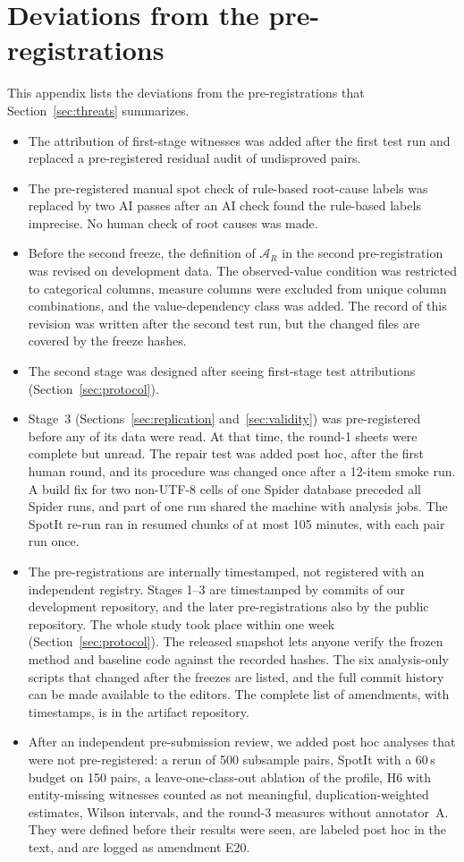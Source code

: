 \section{Deviations from the pre-registrations}\label{app:deviations}
This appendix lists the deviations from the pre-registrations that Section~\ref{sec:threats} summarizes.
\begin{itemize}
\item[(i)] The attribution of first-stage witnesses was added after the first test run and replaced a pre-registered residual audit of undisproved pairs.
\item[(ii)] The pre-registered manual spot check of rule-based root-cause labels was replaced by two AI passes after an AI check found the rule-based labels imprecise. No human check of root causes was made.
\item[(iii)] Before the second freeze, the definition of $\mathcal A_R$ in the second pre-registration was revised on development data. The observed-value condition was restricted to categorical columns, measure columns were excluded from unique column combinations, and the value-dependency class was added. The record of this revision was written after the second test run, but the changed files are covered by the freeze hashes.
\item[(iv)] The second stage was designed after seeing first-stage test attributions (Section~\ref{sec:protocol}).
\item[(v)] Stage~3 (Sections~\ref{sec:replication} and~\ref{sec:validity}) was pre-registered before any of its data were read. At that time, the round-1 sheets were complete but unread. The repair test was added post hoc, after the first human round, and its procedure was changed once after a 12-item smoke run. A build fix for two non-UTF-8 cells of one Spider database preceded all Spider runs, and part of one run shared the machine with analysis jobs. The SpotIt re-run ran in resumed chunks of at most 105 minutes, with each pair run once.
\item[(vi)] The pre-registrations are internally timestamped, not registered with an independent registry. Stages 1--3 are timestamped by commits of our development repository, and the later pre-registrations also by the public repository. The whole study took place within one week (Section~\ref{sec:protocol}). The released snapshot lets anyone verify the frozen method and baseline code against the recorded hashes. The six analysis-only scripts that changed after the freezes are listed, and the full commit history can be made available to the editors. The complete list of amendments, with timestamps, is in the artifact repository.
\item[(vii)] After an independent pre-submission review, we added post hoc analyses that were not pre-registered: a rerun of 500 subsample pairs, SpotIt with a 60\,s budget on 150 pairs, a leave-one-class-out ablation of the profile, H6 with entity-missing witnesses counted as not meaningful, duplication-weighted estimates, Wilson intervals, and the round-3 measures without annotator~A. They were defined before their results were seen, are labeled post hoc in the text, and are logged as amendment E20.
\end{itemize}

